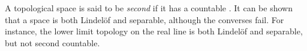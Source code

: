 \documentclass{article}
\begin{document}
A topological space is said to be \emph{second } if it has a countable . 
It can be shown that a  space is both Lindel\"of and separable, although the converses fail.  For instance, the lower limit topology on the real line is both Lindel\"of and separable, but not second countable.
\end{document}
